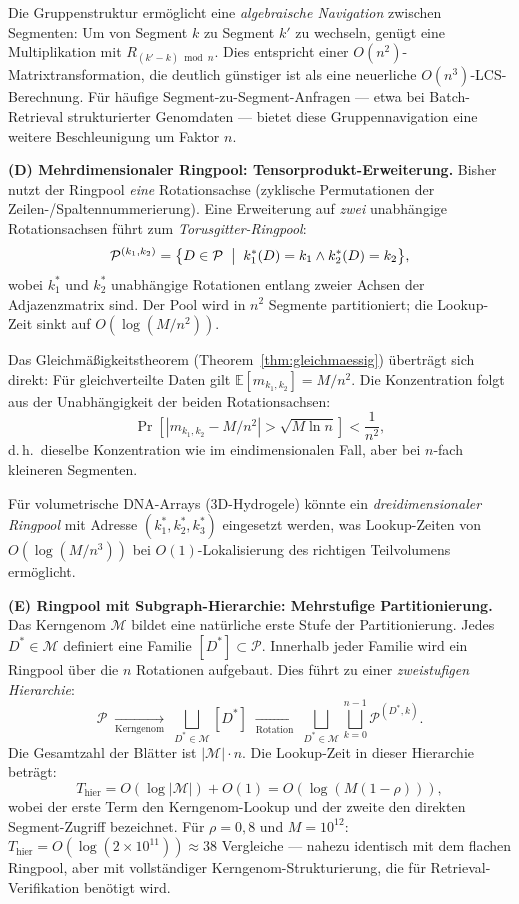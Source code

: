 ﻿\documentclass[a4paper,12pt]{article}
\theoremstyle{definition}
\theoremstyle{plain}
\begin{document}
Die Gruppenstruktur ermöglicht eine \emph{algebraische Navigation}
zwischen Segmenten: Um von Segment $k$ zu Segment $k'$ zu wechseln,
genügt eine Multiplikation mit $R_{(k'-k) \bmod n}$.  Dies entspricht
einer $O(n^2)$-Matrixtransformation, die deutlich günstiger ist als eine
neuerliche $O(n^3)$-LCS-Berechnung.  Für häufige Segment-zu-Segment-Anfragen
--- etwa bei Batch-Retrieval strukturierter Genomdaten --- bietet diese
Gruppennavigation eine weitere Beschleunigung um Faktor $n$.

\textbf{(D) Mehrdimensionaler Ringpool: Tensorprodukt-Erweiterung.}
Bisher nutzt der Ringpool \emph{eine} Rotationsachse (zyklische
Permutationen der Zeilen-/Spaltennummerierung).  Eine Erweiterung auf
\emph{zwei} unabhängige Rotationsachsen führt zum \emph{Torusgitter-Ringpool}:
\[
  \mathcal{P}^{(k_1, k_2)} = \bigl\{D \in \mathcal{P} \;\bigm|\;
    k_1^*(D) = k_1 \wedge k_2^*(D) = k_2\bigr\},
\]
wobei $k_1^*$ und $k_2^*$ unabhängige Rotationen entlang zweier Achsen
der Adjazenzmatrix sind.  Der Pool wird in $n^2$ Segmente partitioniert;
die Lookup-Zeit sinkt auf $O(\log(M/n^2))$.

Das Gleichmäßigkeitstheorem (Theorem~\ref{thm:gleichmaessig}) überträgt
sich direkt: Für gleichverteilte Daten gilt
$\mathbb{E}[m_{k_1,k_2}] = M/n^2$.  Die Konzentration folgt aus
der Unabhängigkeit der beiden Rotationsachsen:
\[
  \Pr\!\left[|m_{k_1,k_2} - M/n^2| > \sqrt{M \ln n}\right]
  < \frac{1}{n^2},
\]
d.\,h.\ dieselbe Konzentration wie im eindimensionalen Fall, aber bei
$n$-fach kleineren Segmenten.

Für volumetrische DNA-Arrays (3D-Hydrogele) könnte ein
\emph{dreidimensionaler Ringpool} mit Adresse $(k_1^*, k_2^*, k_3^*)$
eingesetzt werden, was Lookup-Zeiten von $O(\log(M/n^3))$ bei
$O(1)$-Lokalisierung des richtigen Teilvolumens ermöglicht.

\textbf{(E) Ringpool mit Subgraph-Hierarchie: Mehrstufige Partitionierung.}
Das Kerngenom $\mathcal{M}$ bildet eine natürliche erste Stufe der
Partitionierung.  Jedes $D^* \in \mathcal{M}$ definiert eine Familie
$[D^*] \subset \mathcal{P}$.  Innerhalb jeder Familie wird ein
Ringpool über die $n$ Rotationen aufgebaut.  Dies führt zu einer
\emph{zweistufigen Hierarchie}:
\[
  \mathcal{P}
  \;\underset{\text{Kerngenom}}{\longrightarrow}\;
  \bigsqcup_{D^* \in \mathcal{M}} [D^*]
  \;\underset{\text{Rotation}}{\longrightarrow}\;
  \bigsqcup_{D^* \in \mathcal{M}} \bigsqcup_{k=0}^{n-1} \mathcal{P}^{(D^*, k)}.
\]
Die Gesamtzahl der Blätter ist $|\mathcal{M}| \cdot n$.  Die Lookup-Zeit
in dieser Hierarchie beträgt:
\[
  T_{\mathrm{hier}} = O(\log|\mathcal{M}|) + O(1)
  = O(\log(M(1-\rho))),
\]
wobei der erste Term den Kerngenom-Lookup und der zweite den direkten
Segment-Zugriff bezeichnet.  Für $\rho = 0{,}8$ und $M = 10^{12}$:
$T_{\mathrm{hier}} = O(\log(2 \times 10^{11})) \approx 38$ Vergleiche
--- nahezu identisch mit dem flachen Ringpool, aber mit vollständiger
Kerngenom-Strukturierung, die für Retrieval-Verifikation benötigt wird.
\end{document}
